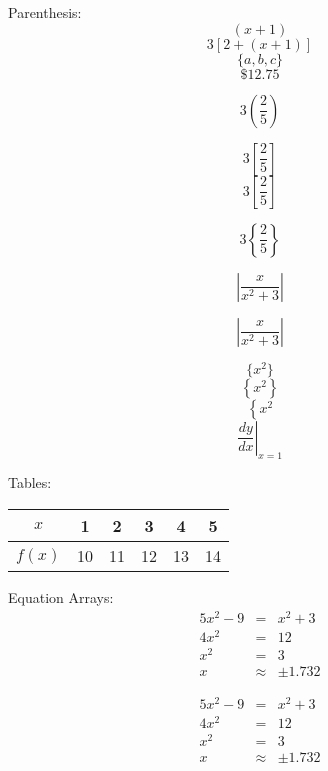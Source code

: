 \documentclass[11pt]{article}
\begin{document}
Parenthesis:
$$(x+1)$$
$$3[2+(x+1)]$$
$$\{a,b,c\}$$
$$\$12.75$$

$$3(\frac{2}{5})$$

$$3[\frac{2}{5}]$$
$$3\left[\frac{2}{5}\right]$$

$$3\left\{\frac{2}{5}\right\}$$

$$|\frac{x}{x^2+3}|$$

$$\left|\frac{x}{x^2+3}\right|$$

$$\{x^2\}$$
$$\left\{x^2\right\}$$
$$\left\{x^2\right.$$
$$\left. \frac{dy}{dx} \right| _{x=1}$$

Tables:
\begin{tabular}{|c|c|c|c|c|c|}
\hline
$x$ & 1 & 2 & 3 & 4 & 5 \\ \hline
$f(x)$ & 10 & 11 & 12  & 13 & 14 \\ \hline
\end{tabular}


Equation Arrays:
\begin{eqnarray}
5x^2 - 9 &=& x^2+3 \\
4x^2 &=& 12 \\
x^2 &=& 3 \\
x&\approx&\pm1.732
\end{eqnarray}

\begin{eqnarray*}
5x^2 - 9 &=& x^2+3 \\
4x^2 &=& 12 \\
x^2 &=& 3 \\
x&\approx&\pm1.732
\end{eqnarray*}
\end{document}
